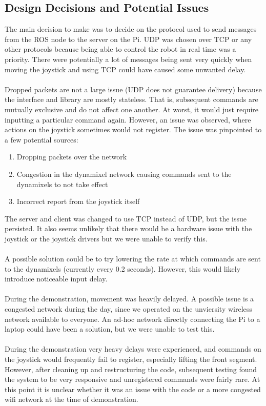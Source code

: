 \documentclass[]{article}
\begin{document}
\subsection{Design Decisions and Potential Issues}
The main decision to make was to decide on the protocol used to send messages from the ROS node to the server on the Pi. UDP was chosen over TCP or any other protocols because being able to control the robot in real time was a priority. There were potentially a lot of messages being sent very quickly when moving the joystick and using TCP could have caused some unwanted delay.
\\
\\
Dropped packets are not a large issue (UDP does not guarantee delivery) because the interface and library are mostly stateless. That is, subsequent commands are mutually exclusive and do not affect one another. At worst, it would just require inputting a particular command again. However, an issue was observed, where actions on the joystick sometimes would not register. The issue was pinpointed to a few potential sources:
\begin{enumerate}
  \item Dropping packets over the network
  \item Congestion in the dynamixel network causing commands sent to the dynamixels to not take effect
  \item Incorrect report from the joystick itself
\end{enumerate}
The server and client was changed to use TCP instead of UDP, but the issue persisted. It also seems unlikely that there would be a hardware issue with the joystick or the joystick drivers but we were unable to verify this.
\\
\\
A possible solution could be to try lowering the rate at which commands are sent to the dynamixels (currently every 0.2 seconds). However, this would likely introduce noticeable input delay.
\\
\\
During the demonstration, movement was heavily delayed. A possible issue is a congested network during the day, since we operated on the unviersity wireless network available to everyone. An ad-hoc network directly connecting the Pi to a laptop could have been a solution, but we were unable to test this.
\\
\\
During the demonstration very heavy delays were experienced, and commands on the joystick would frequently fail to register, especially lifting the front segment. However, after cleaning up and restructuring the code, subsequent testing found the system to be very responsive and unregistered commands were fairly rare. At this point it is unclear whether it was an issue with the code or a more congested wifi network at the time of demonstration.
\end{document}
